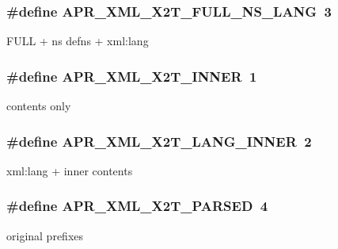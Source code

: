\subsubsection[{\texorpdfstring{A\+P\+R\+\_\+\+X\+M\+L\+\_\+\+X2\+T\+\_\+\+F\+U\+L\+L\+\_\+\+N\+S\+\_\+\+L\+A\+NG}{APR_XML_X2T_FULL_NS_LANG}}]{\setlength{\rightskip}{0pt plus 5cm}\#define A\+P\+R\+\_\+\+X\+M\+L\+\_\+\+X2\+T\+\_\+\+F\+U\+L\+L\+\_\+\+N\+S\+\_\+\+L\+A\+NG~3}\hypertarget{group__APR__Util__XML_ga7b2cd4c48940cd95a56ace294a94d938}{}\label{group__APR__Util__XML_ga7b2cd4c48940cd95a56ace294a94d938}
F\+U\+LL + ns defns + xml\+:lang 
\subsubsection[{\texorpdfstring{A\+P\+R\+\_\+\+X\+M\+L\+\_\+\+X2\+T\+\_\+\+I\+N\+N\+ER}{APR_XML_X2T_INNER}}]{\setlength{\rightskip}{0pt plus 5cm}\#define A\+P\+R\+\_\+\+X\+M\+L\+\_\+\+X2\+T\+\_\+\+I\+N\+N\+ER~1}\hypertarget{group__APR__Util__XML_ga715a5e536efbfa24854531008cf4bdce}{}\label{group__APR__Util__XML_ga715a5e536efbfa24854531008cf4bdce}
contents only 
\subsubsection[{\texorpdfstring{A\+P\+R\+\_\+\+X\+M\+L\+\_\+\+X2\+T\+\_\+\+L\+A\+N\+G\+\_\+\+I\+N\+N\+ER}{APR_XML_X2T_LANG_INNER}}]{\setlength{\rightskip}{0pt plus 5cm}\#define A\+P\+R\+\_\+\+X\+M\+L\+\_\+\+X2\+T\+\_\+\+L\+A\+N\+G\+\_\+\+I\+N\+N\+ER~2}\hypertarget{group__APR__Util__XML_ga4cd40106902732169b8fe7579ba2e67c}{}\label{group__APR__Util__XML_ga4cd40106902732169b8fe7579ba2e67c}
xml\+:lang + inner contents 
\subsubsection[{\texorpdfstring{A\+P\+R\+\_\+\+X\+M\+L\+\_\+\+X2\+T\+\_\+\+P\+A\+R\+S\+ED}{APR_XML_X2T_PARSED}}]{\setlength{\rightskip}{0pt plus 5cm}\#define A\+P\+R\+\_\+\+X\+M\+L\+\_\+\+X2\+T\+\_\+\+P\+A\+R\+S\+ED~4}\hypertarget{group__APR__Util__XML_ga353a5e38ba709b2f158dabdbe05d3074}{}\label{group__APR__Util__XML_ga353a5e38ba709b2f158dabdbe05d3074}
original prefixes 

